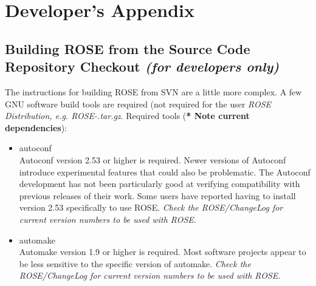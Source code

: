 \chapter{ Developer's Appendix }

\label{developersAppendix:developersAppendix}

\section{Building ROSE from the Source Code Repository Checkout {\em (for developers only)}}
\label{gettingStarted:DeveloperInstructions}

     The instructions for building ROSE from SVN are a little more complex.
A few GNU software build tools are required (not required for the user
{\em ROSE Distribution, e.g. ROSE-\VersionNumber.tar.gz}.  Required 
tools ({\bf ** Note current dependencies}):
\begin{itemize}
     \item autoconf \\
          Autoconf version 2.53 or higher is required. %
          Newer versions of Autoconf introduce experimental features that could also be problematic.  The
          Autoconf development has not been particularly good at verifying compatibility
          with previous releases of their work.  Some users have reported having to
          install version 2.53 specifically to use ROSE. 
          {\em Check the ROSE/ChangeLog for current version numbers to be used with ROSE.}
     \item automake \\
          Automake version 1.9 or higher is required. Most software projects appear to be
          less sensitive to the specific version of automake.
          {\em Check the ROSE/ChangeLog for current version numbers to be used with ROSE.}
\end{itemize}


